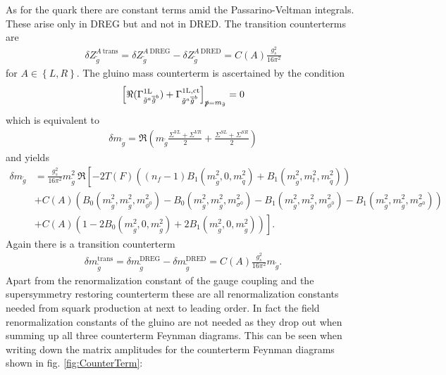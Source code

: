 As for the quark there are constant terms amid the Passarino-Veltman integrals. These arise only in DREG but and not in DRED. The transition counterterms are
\begin{align}
\delta Z_{\tilde{g}}^{A\ \mathrm{trans}} = \delta Z_{\tilde{g}}^{A\ \mathrm{DREG}} - \delta Z_{\tilde{g}}^{A\ \mathrm{DRED}} = C(A) \frac{g_s^2}{16\pi^2}\label{eq:GluinoSC}
\end{align}
for $A \in \left\{L,R\right\}$. The gluino mass counterterm is ascertained by the condition
\begin{align}
\left[ \Re (\Gamma^{\mathrm{1L}}_{\tilde{g}^a \overline{\tilde{g}}^b}) + \Gamma^{\mathrm{1L,ct}}_{\tilde{g}^a \overline{\tilde{g}}^b}  \right]_{\slashed{p} = m_{\tilde{g}}} = 0
\end{align}
which is equivalent to 
\begin{align}
\delta m_{\tilde{g}} = \Re\left( m_{\tilde{g}}\frac{\Sigma^{VL}+\Sigma^{VR}}{2} + \frac{\Sigma^{SL}+\Sigma^{SR}}{2} \right)
\end{align}
and yields
\begin{align}
\delta m_{\tilde{g}} &= \frac{g_s^2}{16\pi^2} m_{\tilde{g}}^2\ \Re \left[ -2T(F) \left( (n_f-1)B_1(m_{\tilde{g}}^2,0,m_{\tilde{q}}^2) + B_1(m_{\tilde{g}}^2,m_t^2,m_{\tilde{q}}^2) \right) \right.\nonumber\\
& + C(A) \left( B_0(m_{\tilde{g}}^2,m_{\tilde{g}}^2,m_{\phi^0}^2) - B_0(m_{\tilde{g}}^2,m_{\tilde{g}}^2,m_{\sigma^0}^2) - B_1(m_{\tilde{g}}^2,m_{\tilde{g}}^2,m_{\phi^0}^2) -
B_1(m_{\tilde{g}}^2,m_{\tilde{g}}^2,m_{\sigma^0}^2) \right)\nonumber\\
& + C(A) \left.\left( 1 - 2 B_0(m_{\tilde{g}}^2,0,m_{\tilde{g}}^2) + 2 B_1(m_{\tilde{g}}^2,0,m_{\tilde{g}}^2) \right)\right].
\end{align}
Again there is a transition counterterm 
\begin{align}
\delta m_{\tilde{g}}^{\mathrm{trans}} = \delta m_{\tilde{g}}^{\mathrm{DREG}} - \delta m_{\tilde{g}}^{\mathrm{DRED}} = C(A) \frac{g_s^2}{16\pi^2} m_{\tilde{g}}.
\end{align}
Apart from the renormalization constant of the gauge coupling and the supersymmetry restoring counterterm these are all renormalization constants needed from squark production at next to leading order. In fact the field renormalization constants of the gluino are not needed as they drop out when summing up all three counterterm Feynman diagrams. This can be seen when writing down the matrix amplitudes for the counterterm Feynman diagrams shown in fig. \ref{fig:CounterTerm}:
